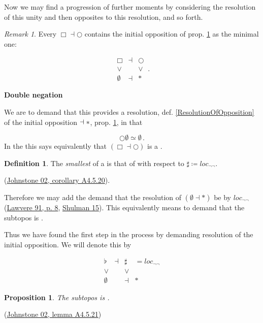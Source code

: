\documentclass[12pt,titlepage]{article}
\newcommand{\itexarray}[1]{\begin{matrix}#1\end{matrix}}
\theoremstyle{plain}
\newtheorem{prop}{Proposition}
\theoremstyle{definition}
\newtheorem{defn}{Definition}
\theoremstyle{remark}
\newtheorem{remark}{Remark}
\begin{document}
Now we may find a progression of further moments by considering the resolution of this unity and then opposites to this resolution, and so forth.

\begin{remark}
\label{}\hypertarget{}{}
Every    $\Box \dashv \bigcirc$ contains the initial opposition of prop. \ref{InitialOpposition} as the minimal one:

\begin{displaymath}
\itexarray{
     \Box &\dashv& \bigcirc
     \\
     \vee && \vee
     \\
     \emptyset &\dashv& \ast
  }
  \,.
\end{displaymath}
\end{remark}
 \textbf{Double negation}

We are to demand that this provides a resolution, def. \ref{ResolutionOfOpposition} of the initial opposition $\empty \dashv \ast$, prop. \ref{InitialOpposition}, in that

\begin{displaymath}
\bigcirc \emptyset \simeq \emptyset
  \,.
\end{displaymath}
In the  this says equivalently that $(\Box \dashv \bigcirc)$ is a .

\begin{defn}
\label{InitialOpposition}\hypertarget{InitialOpposition}{}
The \emph{smallest}  of a  is that of  with respect to  $\sharp \coloneqq loc_{\neg \neg}$.

\end{defn}
(\hyperlink{Johnstone02}{Johnstone 02, corollary A4.5.20}).

Therefore we may add the demand that the resolution of $(\emptyset \dashv \ast)$ be by $loc_{\neg \neg}$ (\hyperlink{Lawvere91}{Lawvere 91, p. 8}, \href{}{Shulman 15}). This equivalently means to demand that the  subtopos is  .

Thus we have found the first step in the process by demanding resolution of the initial opposition. We will denote this by

\begin{displaymath}
\itexarray{
     \flat &\dashv& \sharp & = loc_{\neg \neg}
     \\
     \vee && \vee
     \\
     \emptyset &&\dashv& \ast
  }
\end{displaymath}
\begin{prop}
\label{}\hypertarget{}{}
The  subtopos is .

\end{prop}
(\hyperlink{Johnstone02}{Johnstone 02, lemma A4.5.21})
\end{document}
